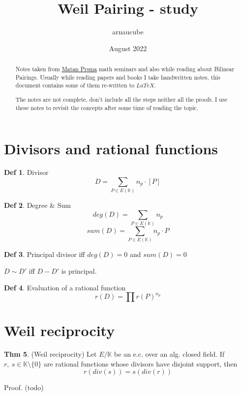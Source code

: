 \documentclass{article}
\title{Weil Pairing - study}
\author{arnaucube}
\date{August 2022}
\theoremstyle{definition}
\newtheorem{definition}{Def}[section]
\newtheorem{theorem}[definition]{Thm}
\begin{document}
\maketitle

\begin{abstract}
  Notes taken from \href{https://sites.google.com/site/matanprasma/artifact}{Matan Prsma} math seminars and also while reading about Bilinear Pairings. Usually while reading papers and books I take handwritten notes, this document contains some of them re-written to $LaTeX$.

	The notes are not complete, don't include all the steps neither all the proofs. I use these notes to revisit the concepts after some time of reading the topic.
\end{abstract}

\tableofcontents

\section{Divisors and rational functions}

\begin{definition}{Divisor}
  $$D= \sum_{P \in E(\mathbb{K})} n_p \cdot [P]$$
\end{definition}

\begin{definition}{Degree \& Sum}
  $$deg(D)= \sum_{P \in E(\mathbb{K})} n_p$$
  $$sum(D)= \sum_{P \in E(\mathbb{K})} n_p \cdot P$$
\end{definition}

\begin{definition}{Principal divisor}
  iff $deg(D)=0$ and $sum(D)=0$
\end{definition}
$D \sim D'$ iff $D - D'$ is principal.


\begin{definition}{Evaluation of a rational function}
  $$r(D)= \prod r(P)^{n_p}$$
\end{definition}

\section{Weil reciprocity}
\begin{theorem}{(Weil reciprocity)}
  Let $E/ \mathbb{K}$ be an e.c. over an alg. closed field. If $r,~s \in \mathbb{K}\setminus \{0\}$ are rational functions whose divisors have disjoint support, then
$$r(div(s)) = s(div(r))$$
\end{theorem}
Proof. (todo)
\end{document}
